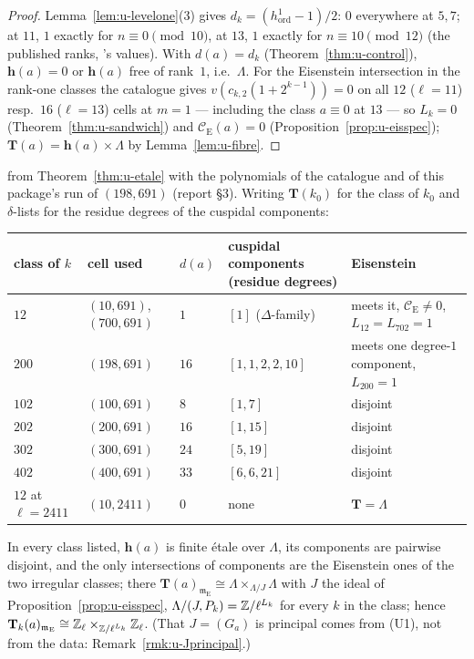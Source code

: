 \documentclass[11pt]{article}
\newcommand{\Iw}{\Lambda}                         %
\newcommand{\hcusp}{\mathbf{h}}                   %
\newcommand{\Tu}{\mathbf{T}}                      %
\newcommand{\Pk}[1]{P_{#1}}                       %
\newcommand{\Eis}{\mathrm{E}}
\newcommand{\Cg}{\mathcal{C}}                     %
\newcommand{\Zl}{\Z_\ell}
\begin{document}
\begin{proof}
Lemma~\ref{lem:u-levelone}(3) gives $d_k=(h^{1}_{\mathrm{ord}}-1)/2$: $0$ everywhere at $5,7$; at $11$, $1$ exactly for $n\equiv0\pmod{10}$, at $13$, $1$
exactly for $n\equiv10\pmod{12}$ (the published ranks,  's values). With $d(a)=d_k$ (Theorem~\ref{thm:u-control}), $\hcusp(a)=0$ or
$\hcusp(a)$ free of rank~$1$, i.e.\ $\Iw$. For the Eisenstein intersection in the rank-one classes the catalogue gives $v(c_{k,2}(1+2^{k-1}))=0$ on all $12$
($\ell=11$) resp.\ $16$ ($\ell=13$) cells at $m=1$ --- including the class $a\equiv0$ at $13$ --- so $L_k=0$ (Theorem~\ref{thm:u-sandwich}) and
$\Cg_\Eis(a)=0$ (Proposition~\ref{prop:u-eisspec}); $\Tu(a)=\hcusp(a)\times\Iw$ by Lemma~\ref{lem:u-fibre}.
\end{proof}

\begin{theorem}[Six classes at $\ell=691$, one at $\ell=2411$]\label{thm:u-691classes}
\PROVED{} from Theorem~\ref{thm:u-etale} with the \COMP{} polynomials of the catalogue and of this package's run of $(198,691)$ (report \S3).
Writing $\Tu(k_0)$ for the class of $k_0$ and $\delta$-lists for the residue degrees of the cuspidal components:
\begin{center}\small
\begin{tabular}{@{}l l l p{} p{}@{}}
\toprule
class of $k$ & cell used & $d(a)$ & cuspidal components (residue degrees) & Eisenstein \\
\midrule
$12$  & $(10,691)$, $(700,691)$ & $1$  & $[1]$ ($\Delta$-family) & meets it, $\Cg_\Eis\ne0$, $L_{12}=L_{702}=1$ \\
$200$ & $(198,691)$           & $16$ & $[1,1,2,2,10]$ & meets one degree-$1$ component, $L_{200}=1$ \\
$102$ & $(100,691)$           & $8$  & $[1,7]$ & disjoint \\
$202$ & $(200,691)$           & $16$ & $[1,15]$ & disjoint \\
$302$ & $(300,691)$           & $24$ & $[5,19]$ & disjoint \\
$402$ & $(400,691)$           & $33$ & $[6,6,21]$ & disjoint \\
\midrule
$12$ at $\ell=2411$ & $(10,2411)$ & $0$ & none & $\Tu=\Iw$ \\
\bottomrule
\end{tabular}
\end{center}
In every class listed, $\hcusp(a)$ is finite étale over $\Iw$, its components are pairwise disjoint, and the only intersections of components are the Eisenstein
ones of the two irregular classes; there $\Tu(a)_{\mathfrak m_\Eis}\cong\Iw\times_{\Iw/J}\Iw$ with $J$ the ideal of
Proposition~\ref{prop:u-eisspec}, $\Iw/(J,\Pk{k})=\Z/\ell^{L_k}$ for every $k$ in the class; hence
$\Tu_k(a)_{\mathfrak m_\Eis}\cong\Zl\times_{\Z/\ell^{L_k}}\Zl$. (That $J=(G_a)$ is principal comes from (U1), not from the data: Remark~\ref{rmk:u-Jprincipal}.)
\end{theorem}
\end{document}
